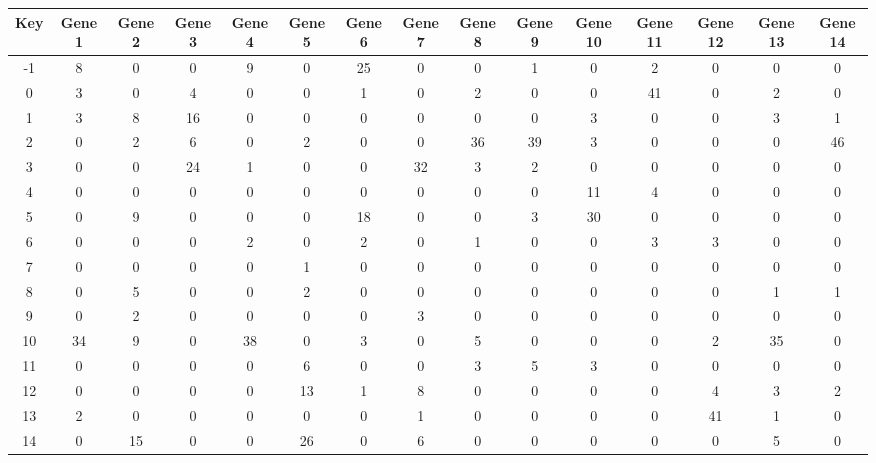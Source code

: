 \begin{tabular}{|c|c|c|c|c|c|c|c|c|c|c|c|c|c|c|}
\hline
Key & Gene 1 & Gene 2 & Gene 3 & Gene 4 & Gene 5 & Gene 6 & Gene 7 & Gene 8 & Gene 9 & Gene 10 & Gene 11 & Gene 12 & Gene 13 & Gene 14 \\
\hline
-1 & 8 & 0 & 0 & 9 & 0 & 25 & 0 & 0 & 1 & 0 & 2 & 0 & 0 & 0 \\
0 & 3 & 0 & 4 & 0 & 0 & 1 & 0 & 2 & 0 & 0 & 41 & 0 & 2 & 0 \\
1 & 3 & 8 & 16 & 0 & 0 & 0 & 0 & 0 & 0 & 3 & 0 & 0 & 3 & 1 \\
2 & 0 & 2 & 6 & 0 & 2 & 0 & 0 & 36 & 39 & 3 & 0 & 0 & 0 & 46 \\
3 & 0 & 0 & 24 & 1 & 0 & 0 & 32 & 3 & 2 & 0 & 0 & 0 & 0 & 0 \\
4 & 0 & 0 & 0 & 0 & 0 & 0 & 0 & 0 & 0 & 11 & 4 & 0 & 0 & 0 \\
5 & 0 & 9 & 0 & 0 & 0 & 18 & 0 & 0 & 3 & 30 & 0 & 0 & 0 & 0 \\
6 & 0 & 0 & 0 & 2 & 0 & 2 & 0 & 1 & 0 & 0 & 3 & 3 & 0 & 0 \\
7 & 0 & 0 & 0 & 0 & 1 & 0 & 0 & 0 & 0 & 0 & 0 & 0 & 0 & 0 \\
8 & 0 & 5 & 0 & 0 & 2 & 0 & 0 & 0 & 0 & 0 & 0 & 0 & 1 & 1 \\
9 & 0 & 2 & 0 & 0 & 0 & 0 & 3 & 0 & 0 & 0 & 0 & 0 & 0 & 0 \\
10 & 34 & 9 & 0 & 38 & 0 & 3 & 0 & 5 & 0 & 0 & 0 & 2 & 35 & 0 \\
11 & 0 & 0 & 0 & 0 & 6 & 0 & 0 & 3 & 5 & 3 & 0 & 0 & 0 & 0 \\
12 & 0 & 0 & 0 & 0 & 13 & 1 & 8 & 0 & 0 & 0 & 0 & 4 & 3 & 2 \\
13 & 2 & 0 & 0 & 0 & 0 & 0 & 1 & 0 & 0 & 0 & 0 & 41 & 1 & 0 \\
14 & 0 & 15 & 0 & 0 & 26 & 0 & 6 & 0 & 0 & 0 & 0 & 0 & 5 & 0 \\
\hline
\end{tabular}